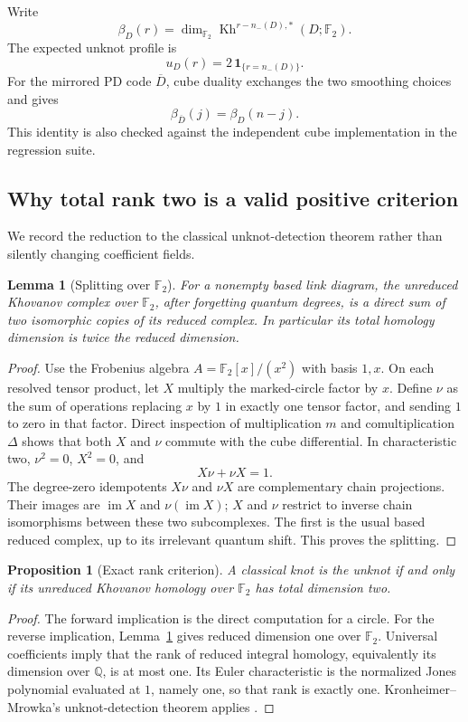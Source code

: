 \documentclass[11pt]{article}
\newtheorem{lemma}[theorem]{Lemma}
\newtheorem{proposition}[theorem]{Proposition}
\theoremstyle{definition}\newtheorem{definition}[theorem]{Definition}
\theoremstyle{remark}\newtheorem{remark}[theorem]{Remark}
\newcommand{\F}{\mathbb F_2}
\newcommand{\Kh}{\operatorname{Kh}}
\begin{document}
Write
\[
 \beta_D(r)=\dim_{\F}\Kh^{r-n_-(D),*}(D;\F).
\]
The expected unknot profile is
\begin{equation}
 u_D(r)=2\,\mathbf 1_{\{r=n_-(D)\}}.\label{eq:unknotprofile}
\end{equation}
For the mirrored PD code $\overline D$, cube duality exchanges the two smoothing choices and gives
\begin{equation}
 \beta_{\overline D}(j)=\beta_D(n-j).\label{eq:mirror}
\end{equation}
This identity is also checked against the independent cube implementation in the regression suite.

\subsection{Why total rank two is a valid positive criterion}
We record the reduction to the classical unknot-detection theorem rather than silently changing coefficient fields.

\begin{lemma}[Splitting over $\F$]\label{lem:splitting}
For a nonempty based link diagram, the unreduced Khovanov complex over $\F$, after forgetting quantum degrees, is a direct sum of two isomorphic copies of its reduced complex. In particular its total homology dimension is twice the reduced dimension.
\end{lemma}
\begin{proof}
Use the Frobenius algebra $A=\F[x]/(x^2)$ with basis $1,x$. On each resolved tensor product, let $X$ multiply the marked-circle factor by $x$. Define $\nu$ as the sum of operations replacing $x$ by $1$ in exactly one tensor factor, and sending $1$ to zero in that factor. Direct inspection of multiplication $m$ and comultiplication $\Delta$ shows that both $X$ and $\nu$ commute with the cube differential. In characteristic two, $\nu^2=0$, $X^2=0$, and
\[
 X\nu+\nu X=1.
\]
The degree-zero idempotents $X\nu$ and $\nu X$ are complementary chain projections. Their images are $\operatorname{im}X$ and $\nu(\operatorname{im}X)$; $X$ and $\nu$ restrict to inverse chain isomorphisms between these two subcomplexes. The first is the usual based reduced complex, up to its irrelevant quantum shift. This proves the splitting.
\end{proof}

\begin{proposition}[Exact rank criterion]\label{prop:detection}
A classical knot is the unknot if and only if its unreduced Khovanov homology over $\F$ has total dimension two.
\end{proposition}
\begin{proof}
The forward implication is the direct computation for a circle. For the reverse implication, Lemma~\ref{lem:splitting} gives reduced dimension one over $\F$. Universal coefficients imply that the rank of reduced integral homology, equivalently its dimension over $\mathbb Q$, is at most one. Its Euler characteristic is the normalized Jones polynomial evaluated at $1$, namely one, so that rank is exactly one. Kronheimer--Mrowka's unknot-detection theorem applies \cite{KM}.
\end{proof}
\end{document}
